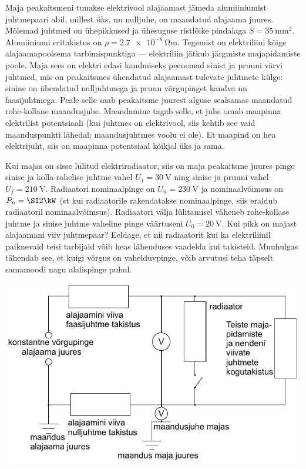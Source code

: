 
Maja peakaitsmeni tuuakse elektrivool alajaamast jämeda alumiiniumist juhtmepaari abil, millest üks, nn nulljuhe, on maandatud alajaama juures. Mõlemad juhtmed on ühepikkused ja ühesuguse ristlõike pindalaga $S=\SI{35}{\mm\squared}$. Alumiiniumi eritakistus on $\rho=\SI{2.7e-8}{\ohm\m}$. Tegemist on elektriliini kõige alajaamapoolsema tarbimispunktiga --- elektriliin jätkub järgmiste majapidamiste poole. Maja sees on elektri edasi kandmiseks peenemad sinist ja pruuni värvi juhtmed, mis on peakaitsmes ühendatud alajaamast tulevate juhtmete külge: sinine on ühendatud nulljuhtmega ja pruun võrgupinget kandva nn faasijuhtmega. Peale selle saab peakaitsme juurest alguse sealsamas maandatud rohe-kollane maandusjuhe. Maandamine tagab selle, et juhe omab maapinna elektrilist potentsiaali (kui juhtmes on elektrivool, siis kehtib see vaid maanduspunkti lähedal; maandusjuhtmes voolu ei ole). Et maapind on hea elektrijuht, siis on maapinna potentsiaal kõikjal üks ja sama. 

Kui majas on sisse lülitud  elektriradiaator, siis on maja peakaitsme juures pinge sinise ja kolla-rohelise juhtme vahel $U_1=\SI{30}\V$  ning sinise ja pruuni vahel $U_f=\SI{210}\V$. Radiaatori nominaalpinge on $U_n=\SI{230}\V$ ja nominaalvõimsus on $P_n=\SI 2{\kW}$ (st kui radiaatorile rakendatakse nominaalpinge, siis eraldub radiaatoril nominaalvõimsus). Radiaatori välja lülitamisel väheneb rohe-kollase juhtme ja sinise juhtme vaheline pinge väärtuseni $U_0=\SI{20}\V$. Kui pikk on majast alajaamani viiv juhtmepaar? Eeldage, et nii radiaatorit kui ka elektriliinil paiknevaid teisi tarbijaid võib heas lähenduses vaadelda kui takisteid. Muuhulgas tähendab see, et kuigi võrgus on vahelduvpinge, võib arvutusi teha täpselt samamoodi nagu alalispinge puhul.


\hint

\solu
\begin{center}
    \includegraphics[width=0.8\linewidth]{2023-v2g-10-yl.pdf}
\end{center}

